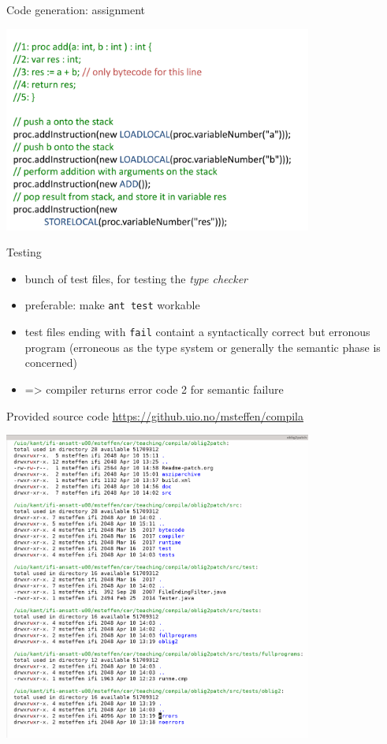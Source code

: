 \documentclass{beamer}
\begin{document}
\begin{frame}[label={sec:org5d56c72}]{Code generation: assignment}
\begin{center}
 \includegraphics[width=0.76\textwidth]{figures/snaps/codegen-assignment}
\end{center}
\end{frame}



\begin{frame}[label={sec:orgf794a64},fragile]{Testing}
 \begin{itemize}
\item bunch of test files, for testing the \emph{type checker}
\item preferable: make \texttt{ant test} workable

\item test files ending with \texttt{fail} containt a syntactically correct but
erronous program (erroneous as the type system or generally the semantic
phase is concerned)

\item => compiler returns error code 2 for semantic failure
\end{itemize}
\end{frame}



\begin{frame}[label={sec:orgf380572}]{Provided source code}
\url{https://github.uio.no/msteffen/compila}

\includegraphics[width=0.76\textwidth]{figures/snaps/directorystruct}
\end{frame}
\end{document}
